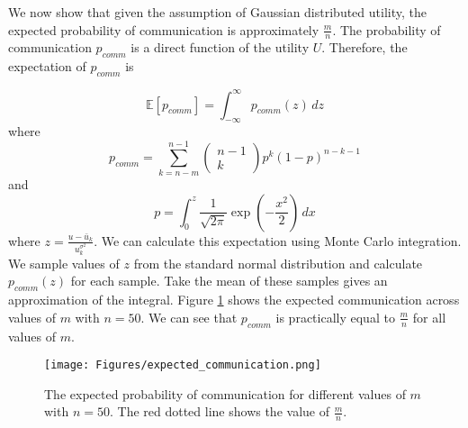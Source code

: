 We now show that given the assumption of Gaussian distributed utility, the expected probability of communication is approximately $\frac{m}{n}$. The probability of communication $p_{comm}$ is a direct function of the utility $U$. Therefore, the expectation of $p_{comm}$ is

\begin{equation*}
    \mathbb{E} \left[ p_{comm}\right] = \int_{-\infty}^\infty p_{comm}(z) \, dz
\end{equation*}
where
\begin{equation*}
    p_{comm} = \sum_{k=n-m}^{n-1} \begin{pmatrix}n-1 \\ k\end{pmatrix}p^k(1-p)^{n-k-1}
\end{equation*}
and 
\begin{equation*}
    p = \int_0^z \frac{1}{\sqrt{2 \pi}} \exp(-\frac{x^2}{2}) \, dx
\end{equation*}
where $z=\frac{u-\bar{u}_k}{u_k^{\sigma^2}}$.
We can calculate this expectation using Monte Carlo integration. We sample values of $z$ from the standard normal distribution and calculate $p_{comm}(z)$ for each sample. Take the mean of these samples gives an approximation of the integral. Figure \ref{fig:ExpComm} shows the expected communication across values of $m$ with $n=50$. We can see that $p_{comm}$ is practically equal to $\frac{m}{n}$ for all values of $m$.

\begin{figure}
    \centering
    \texttt{[image: Figures/expected\_communication.png]}
    \caption{The expected probability of communication for different values of $m$ with $n=50$. The red dotted line shows the value of $\frac{m}{n}$.}
    \label{fig:ExpComm}
\end{figure}


